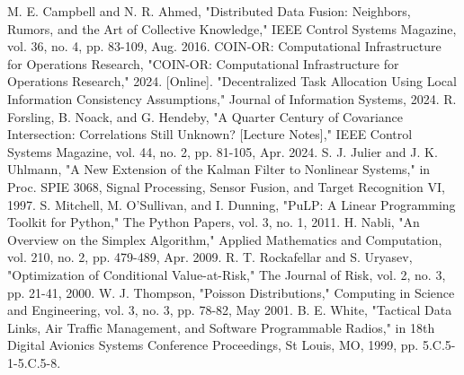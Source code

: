 \documentclass[conference]{IEEEtran}
\begin{document}

\begin{thebibliography}{00}

 M. E. Campbell and N. R. Ahmed, "Distributed Data Fusion: Neighbors, Rumors, and the Art of Collective Knowledge," IEEE Control Systems Magazine, vol. 36, no. 4, pp. 83-109, Aug. 2016.
 COIN-OR: Computational Infrastructure for Operations Research, "COIN-OR: Computational Infrastructure for Operations Research," 2024. [Online].
 "Decentralized Task Allocation Using Local Information Consistency Assumptions," Journal of Information Systems, 2024.
 R. Forsling, B. Noack, and G. Hendeby, "A Quarter Century of Covariance Intersection: Correlations Still Unknown? [Lecture Notes]," IEEE Control Systems Magazine, vol. 44, no. 2, pp. 81-105, Apr. 2024.
 S. J. Julier and J. K. Uhlmann, "A New Extension of the Kalman Filter to Nonlinear Systems," in Proc. SPIE 3068, Signal Processing, Sensor Fusion, and Target Recognition VI, 1997.
 S. Mitchell, M. O'Sullivan, and I. Dunning, "PuLP: A Linear Programming Toolkit for Python," The Python Papers, vol. 3, no. 1, 2011.
 H. Nabli, "An Overview on the Simplex Algorithm," Applied Mathematics and Computation, vol. 210, no. 2, pp. 479-489, Apr. 2009.
 R. T. Rockafellar and S. Uryasev, "Optimization of Conditional Value-at-Risk," The Journal of Risk, vol. 2, no. 3, pp. 21-41, 2000.
 W. J. Thompson, "Poisson Distributions," Computing in Science and Engineering, vol. 3, no. 3, pp. 78-82, May 2001.
 B. E. White, "Tactical Data Links, Air Traffic Management, and Software Programmable Radios," in 18th Digital Avionics Systems Conference Proceedings, St Louis, MO, 1999, pp. 5.C.5-1-5.C.5-8.

\end{thebibliography}
\end{document}
